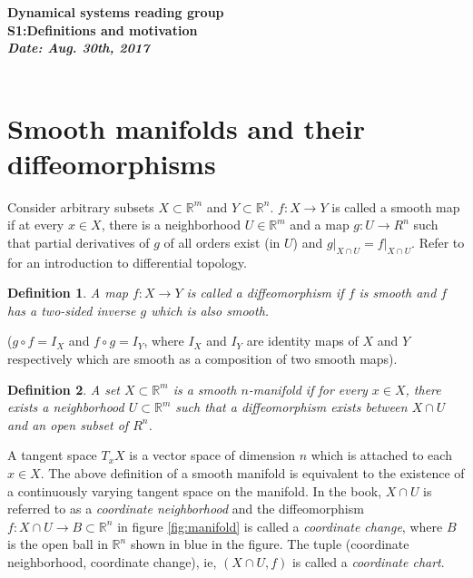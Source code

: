 \documentclass[11pt]{article}
\newtheorem{definition}{Definition}
\begin{document}
\begin{center}
{\large \bf	Dynamical systems reading group \\[1ex]
			S1:Definitions and motivation
\\[2ex]
	   	{\it Date: Aug. 30th, 2017} \hfill \\[-1.5ex]	  
 	\hrulefill \\
				
}
\end{center}


\section*{Smooth manifolds and their diffeomorphisms}

Consider arbitrary subsets $X \subset \mathbb{R}^m$ and $Y \subset \mathbb{R}^n$. $f:X\to Y$ is called a smooth map if at every $x \in X$, there is a 
neighborhood $U \in \mathbb{R}^m$ and a map $g:U\to R^n$ such that 
partial derivatives of $g$ of all orders exist (in $U$) and $g\bigg|_{X \cap
U} = f\bigg|_{X \cap U}$. Refer to \cite{milnor,milnor2011} for an introduction 
to differential topology.

\begin{definition}
A map $f:X\to Y$ is called a diffeomorphism if $f$ is smooth and 
$f$ has a two-sided inverse $g$ which is also smooth.\end{definition} 

 ($g\circ f = I_X$
and $f\circ g = I_Y$, where $I_X$ and $I_Y$ are identity maps 
of $X$ and $Y$ respectively which are smooth as a composition of two smooth maps).

\begin{definition}
A set $X \subset \mathbb{R}^m$ is a smooth $n$-manifold if for every $x \in X$, there exists 
a neighborhood $U \subset \mathbb{R}^m$ such that a diffeomorphism exists
between $X \cap U$ and an open subset of $R^n$.
\end{definition} 

A tangent space $T_x X$ is a vector space of dimension $n$ which is attached to 
each $x \in X$. The above definition of a smooth manifold is equivalent to the existence of a
continuously varying tangent space on the manifold. In the book, $X \cap U$ is 
referred to as a \emph{coordinate neighborhood} and the diffeomorphism $f: X\cap U \to B \subset \mathbb{R}^n$
in figure \ref{fig:manifold} is called a \emph{coordinate change}, where $B$ is the open ball
in $\mathbb{R}^n$ shown in blue in the figure. The tuple (coordinate neighborhood, coordinate change), 
ie, $(X\cap U, f)$ is called a \emph{coordinate chart}.
\end{document}
